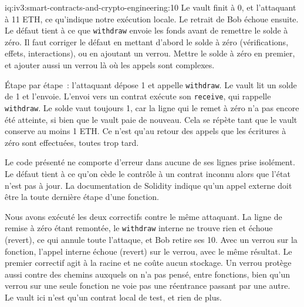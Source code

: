 \begin{solution}{iq:iv3:smart-contracts-and-crypto-engineering:10}
Le vault finit à 0, et l'attaquant à 11 ETH, ce qu'indique notre exécution locale. Le retrait de Bob échoue ensuite. Le défaut tient à ce que \texttt{withdraw} envoie les fonds avant de remettre le solde à zéro. Il faut corriger le défaut en mettant d'abord le solde à zéro (vérifications, effets, interactions), ou en ajoutant un verrou. Mettre le solde à zéro en premier, et ajouter aussi un verrou là où les appels sont complexes.

Étape par étape~: l'attaquant dépose 1 et appelle \texttt{withdraw}. Le vault lit un solde de 1 et l'envoie. L'envoi vers un contrat exécute son \texttt{receive}, qui rappelle \texttt{withdraw}. Le solde vaut toujours 1, car la ligne qui le remet à zéro n'a pas encore été atteinte, si bien que le vault paie de nouveau. Cela se répète tant que le vault conserve au moins 1 ETH. Ce n'est qu'au retour des appels que les écritures à zéro sont effectuées, toutes trop tard.

Le code présenté ne comporte d'erreur dans aucune de ses lignes prise isolément. Le défaut tient à ce qu'on cède le contrôle à un contrat inconnu alors que l'état n'est pas à jour. La documentation de Solidity indique qu'un appel externe doit être la toute dernière étape d'une fonction.

Nous avons exécuté les deux correctifs contre le même attaquant. La ligne de remise à zéro étant remontée, le \texttt{withdraw} interne ne trouve rien et échoue (revert), ce qui annule toute l'attaque, et Bob retire ses 10. Avec un verrou sur la fonction, l'appel interne échoue (revert) sur le verrou, avec le même résultat. Le premier correctif agit à la racine et ne coûte aucun stockage. Un verrou protège aussi contre des chemins auxquels on n'a pas pensé, entre fonctions, bien qu'un verrou sur une seule fonction ne voie pas une réentrance passant par une autre. Le vault ici n'est qu'un contrat local de test, et rien de plus.

\end{solution}

